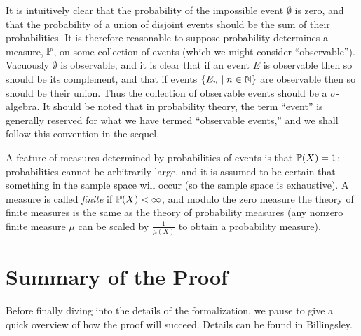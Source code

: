 \documentclass{amsart}
\theoremstyle{definition}
\theoremstyle{remark}
\newcommand{\bldset}[2]{\{{#1}\mid{#2}\}}
\begin{document}
It is intuitively clear that the probability of the impossible event $\emptyset$ is zero, and that the probability of a union of disjoint events should be the sum of their probabilities. It is therefore reasonable to suppose probability determines a measure, $\P$, on some collection of events (which we might consider ``observable''). Vacuously $\emptyset$ is observable, and it is clear that if an event $E$ is observable then so should be its complement, and that if events $\bldset{E_n}{n \in \N}$ are observable then so should be their union. Thus the collection of observable events should be a $\sigma$-algebra. It should be noted that in probability theory, the term ``event'' is generally reserved for what we have termed ``observable events,'' and we shall follow this convention in the sequel.

A feature of measures determined by probabilities of events is that $\P(X) = 1$; probabilities cannot be arbitrarily large, and it is assumed to be certain that something in the sample space will occur (so the sample space is exhaustive). A measure is called {\em finite} if $\P(X) < \infty$, and modulo the zero measure the theory of finite measures is the same as the theory of probability measures (any nonzero finite measure $\mu$ can be scaled by $\frac{1}{\mu(X)}$ to obtain a probability measure).

\section{Summary of the Proof}

Before finally diving into the details of the formalization, we pause to give a quick overview of how the proof will succeed. Details can be found in Billingsley.
\end{document}
